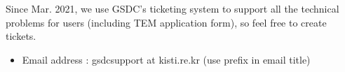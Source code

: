 \documentclass[a4paper,10pt,english]{sphinxmanual}
\begin{document}
\sphinxAtStartPar
Since Mar. 2021, we use GSDC’s ticketing system to support all the technical problems for users (including TEM application form), so feel free to create tickets.
\begin{itemize}
\item {} 
\sphinxAtStartPar
E\sphinxhyphen{}mail address : gsdc\sphinxhyphen{}support at kisti.re.kr (use \sphinxstylestrong{{[}TEM{]}} prefix in e\sphinxhyphen{}mail title)

\end{itemize}



\renewcommand{\indexname}{Index}
\printindex
\end{document}
